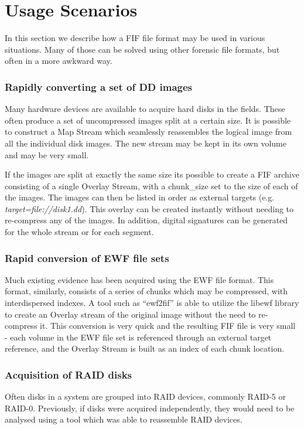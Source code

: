 \documentclass[10pt, conference]{IEEEtran}
\begin{document}
\section{Usage Scenarios}
In this section we describe how a FIF file format may be used in
various situations. Many of those can be solved using other forensic
file formats, but often in a more awkward way.

\subsubsection{Rapidly converting a set of DD images}
Many hardware devices are available to acquire hard disks in the
fields. These often produce a set of uncompressed images split at a
certain size. It is possible to construct a Map Stream which
seamlessly reassembles the logical image from all the individual disk
images. The new stream may be kept in its own volume and may be very
small. 

If the images are split at exactly the same size its
possible to create a FIF archive consisting of a single Overlay
Stream, with a chunk\_size set to the size of each of the images. The
images can then be listed in order as external targets (e.g. {\em
target=file://disk1.dd}). This overlay can be created instantly
without needing to re-compress any of the images. In addition, digital
signatures can be generated for the whole stream or for each segment.

\subsubsection{Rapid conversion of EWF file sets}
Much existing evidence has been acquired using the EWF file
format. This format, similarly, consists of a series of chunks which
may be compressed, with interdispersed indexes. A tool such as
``ewf2fif'' is able to utilize the libewf library to create an Overlay
stream of the original image without the need to re-compress it. This
conversion is very quick and the resulting FIF file is very small -
each volume in the EWF file set is referenced through an external
target reference, and the Overlay Stream is built as an index of each
chunk location.

\subsubsection{Acquisition of RAID disks}
Often disks in a system are grouped into RAID devices, commonly RAID-5
or RAID-0. Previously, if disks were acquired independently, they
would need to be analysed using a tool which was able to reassemble
RAID devices.
\end{document}
